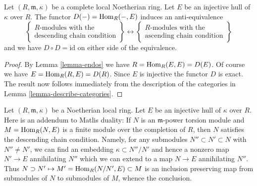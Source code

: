 \begin{proposition}
\label{proposition-matlis}
Let $(R, \mathfrak m, \kappa)$ be a complete local Noetherian ring.
Let $E$ be an injective hull of $\kappa$ over $R$. The functor
$D(-) = \mathop{\mathrm{Hom}}\nolimits_R(-, E)$ induces an anti-equivalence
$$
\left\{
\begin{matrix}
R\text{-modules with the} \\
\text{descending chain condition}
\end{matrix}
\right\}
\longleftrightarrow
\left\{
\begin{matrix}
R\text{-modules with the} \\
\text{ascending chain condition}
\end{matrix}
\right\}
$$
and we have $D \circ D = \text{id}$ on either side of the equivalence.
\end{proposition}

\begin{proof}
By Lemma \ref{lemma-endos} we have $R = \mathop{\mathrm{Hom}}\nolimits_R(E, E) = D(E)$.
Of course we have $E = \mathop{\mathrm{Hom}}\nolimits_R(R, E) = D(R)$. Since $E$ is injective
the functor $D$ is exact. The result now follows immediately from the
description of the categories in
Lemma \ref{lemma-describe-categories}.
\end{proof}

\begin{remark}
\label{remark-matlis}
Let $(R, \mathfrak m, \kappa)$ be a Noetherian local ring.
Let $E$ be an injective hull of $\kappa$ over $R$. Here is an
addendum to Matlis duality: If $N$ is an $\mathfrak m$-power torsion module
and $M = \mathop{\mathrm{Hom}}\nolimits_R(N, E)$ is a finite module over the completion of $R$,
then $N$ satisfies the descending chain condition. Namely, for any
submodules $N'' \subset N' \subset N$ with $N'' \not = N'$, we can
find an embedding $\kappa \subset N''/N'$ and hence a nonzero
map $N' \to E$ annihilating $N''$ which we can extend to a map $N \to E$
annihilating $N''$. Thus $N \supset N' \mapsto M' = \mathop{\mathrm{Hom}}\nolimits_R(N/N', E) \subset M$
is an inclusion preserving map from submodules of $N$ to submodules
of $M$, whence the conclusion.
\end{remark}




















